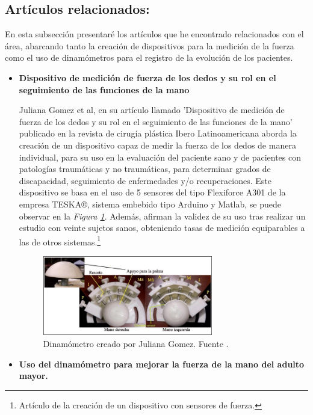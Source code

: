 \subsection{Artículos relacionados:}
En esta subsección presentaré los artículos que he encontrado relacionados con el área, abarcando tanto la creación de dispositivos para la medición de la fuerza como el uso de dinamómetros para el registro de la evolución de los pacientes.
\begin{itemize}
    \item \textbf{Dispositivo de medición de fuerza de los dedos y su
rol en el seguimiento de las funciones de la mano}

Juliana Gomez et al, en su artículo llamado 'Dispositivo de medición de fuerza de los dedos y su rol en el seguimiento de las funciones de la mano' publicado en la revista de cirugía plástica Ibero Latinoamericana aborda la creación de un dispositivo capaz de medir la fuerza de los dedos de manera individual, para su uso en la evaluación del paciente sano y de pacientes con patologías traumáticas y no traumáticas, para determinar grados de discapacidad, seguimiento de enfermedades y/o recuperaciones. 
Este dispositivo se basa en el uso de 5 sensores del tipo Flexiforce A301 de la empresa TESKA®, sistema embebido
tipo Arduino y Matlab, se puede observar en la \textit{Figura \ref{fig:Dinamómetro creado por Juliana Gomez}}. Además, afirman la validez de su uso tras realizar un estudio con veinte sujetos sanos, obteniendo tasas de medición equiparables a las de otros sistemas.\cite{GOMEZ2022}\footnote{Artículo de la creación de un dispositivo con sensores de fuerza\cite{GOMEZ2022}.}
    \begin{figure}[h]
        \centering
        \includegraphics[width=0.7\textwidth]{img/dispositivo Revista.jpg}
        \caption{Dinamómetro creado por Juliana Gomez. Fuente \cite{GOMEZ2022}.}
        \label{fig:Dinamómetro creado por Juliana Gomez}
    \end{figure}
    \item \textbf{Uso del dinamómetro para mejorar la fuerza de la mano del adulto mayor.}
    

\end{itemize}
